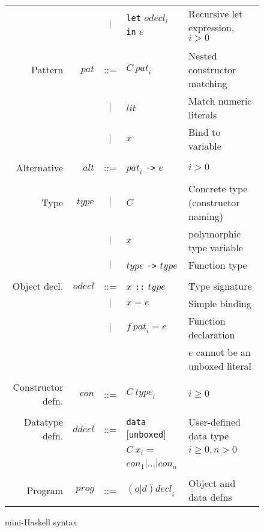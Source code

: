 \documentclass{llncs}
\begin{document}
\begin{figure}
\begin{tabular}{r r c l l}
                   &                     & $|$ & \texttt{let} $\mathit{odecl}_i$ \texttt{in} $e$ & Recursive let expression, $i > 0$ \\

\\
Pattern            & $\mathit{pat}$      & ::= & $C\ \mathit{pat}_i$ & Nested constructor matching \\
                   &                     & $|$ & $\mathit{lit}$ & Match numeric literals \\
                   &                     & $|$ & $x$ & Bind to variable \\

\\
Alternative        & $\mathit{alt}$      & ::= & $\mathit{pat}_i$ \texttt{->} $e$ & $i > 0$ \\
\\
Type               & $\mathit{type}$     & $|$ & $C$ & Concrete type (constructor naming) \\
                   &                     & $|$ & $x$ & polymorphic type variable \\
                   &                     & $|$ & $\mathit{type}$ \texttt{->} $\mathit{type}$ & Function type \\
\\
Object decl. & $\mathit{odecl}$    & ::= & $x$ \texttt{::} $\mathit{type}$ & Type signature \\
                   &                     & $|$ & $x = e$ & Simple binding \\
                   &                     & $|$ & $f\ \mathit{pat}_i = e$ & Function declaration \\
                   &                     &     & & $e$ cannot be an unboxed literal \\
\\
Constructor defn. & $\mathit{con}$  & ::= & $C\ \mathit{type}_i$ & $i \ge 0$ \\
\\
Datatype defn. &  $\mathit{ddecl}$ & ::= & \texttt{data} [\texttt{unboxed}] & User-defined data type  \\
               &                   &     & $C\ x_i =$                       & $i \ge 0, n > 0$         \\
               &                   &     & $\mathit{con}_1 | \dots |  \mathit{con}_n$ \\

\\
Program                & $\mathit{prog}$ & ::= & $\mathit{(o|d)decl}_i$ & Object and data defns
\end{tabular}
\caption{mini-Haskell syntax}
\label{fig:miniHaskell}
\end{figure}
\end{document}
